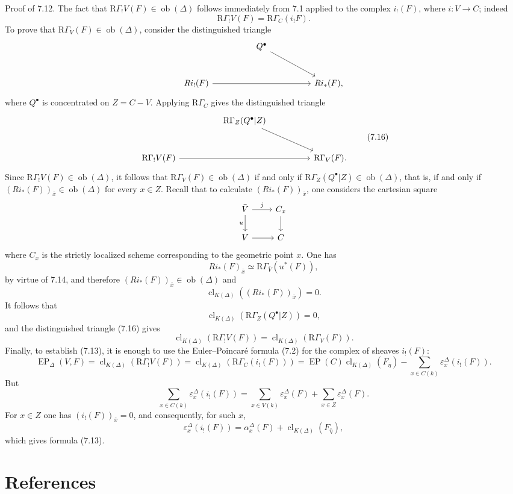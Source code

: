 \documentclass[11pt]{article}
\providecommand{\EP}{\operatorname{EP}}
\providecommand{\Ob}{\operatorname{ob}}
\providecommand{\Ob}{\operatorname{ob}}
\providecommand{\EP}{\operatorname{EP}}
\providecommand{\Ob}{\operatorname{Ob}}
\providecommand{\clK}[1]{\operatorname{cl}_{K(#1)}}
\providecommand{\RG}{\mathrm R\Gamma}
\providecommand{\Ob}{\operatorname{ob}}
\begin{document}
Proof of 7.12. The fact that $\RG_!V(F)\in\Ob(\Delta)$ follows immediately from 7.1 applied to the complex $i_!(F)$, where $i:V\to C$; indeed
\[
\RG_!V(F)=\RG_C(i_!F).
\]
To prove that $\RG_V(F)\in\Ob(\Delta)$, consider the distinguished triangle
\[
\begin{tikzcd}[column sep=huge,row sep=large]
& Q^\bullet \arrow[dr] &\\
Ri_!(F) \arrow[rr] && Ri_*(F),
\end{tikzcd}
\]
where $Q^\bullet$ is concentrated on $Z=C-V$. Applying $\RG_C$ gives the distinguished triangle
\[
\begin{tikzcd}[column sep=huge,row sep=large]
& \RG_Z(Q^\bullet|Z) \arrow[dr] &\\
\RG_!V(F) \arrow[rr] && \RG_V(F).
\end{tikzcd}
\tag{7.16}
\]
Since $\RG_!V(F)\in\Ob(\Delta)$, it follows that $\RG_V(F)\in\Ob(\Delta)$ if and only if $\RG_Z(Q^\bullet|Z)\in\Ob(\Delta)$, that is, if and only if $(Ri_*(F))_{\bar x}\in\Ob(\Delta)$ for every $x\in Z$. Recall that to calculate $(Ri_*(F))_{\bar x}$, one considers the cartesian square
\[
\begin{tikzcd}
\bar V \arrow[r,"j"] \arrow[d,"u"'] & C_x \arrow[d]\\
V \arrow[r] & C
\end{tikzcd}
\]
where $C_x$ is the strictly localized scheme corresponding to the geometric point $x$. One has
\[
Ri_*(F)_{\bar x}\simeq \RG_{\bar V}(u^*(F)),
\]
by virtue of 7.14, and therefore $(Ri_*(F))_{\bar x}\in\Ob(\Delta)$ and
\[
\clK{\Delta}((Ri_*(F))_{\bar x})=0.
\]
It follows that
\[
\clK{\Delta}(\RG_Z(Q^\bullet|Z))=0,
\]
and the distinguished triangle (7.16) gives
\[
\clK{\Delta}(\RG_!V(F))=\clK{\Delta}(\RG_V(F)).
\]
Finally, to establish (7.13), it is enough to use the Euler--Poincaré formula (7.2) for the complex of sheaves $i_!(F)$:
\[
\EP_\Delta(V,F)
=
\clK{\Delta}(\RG_!V(F))
=
\clK{\Delta}(\RG_C(i_!(F)))
=
\EP(C)\clK{\Delta}(F_{\bar\eta})
-\sum_{x\in C(k)}\varepsilon_x^\Delta(i_!(F)).
\]
But
\[
\sum_{x\in C(k)}\varepsilon_x^\Delta(i_!(F))
=
\sum_{x\in V(k)}\varepsilon_x^\Delta(F)
+\sum_{x\in Z}\varepsilon_x^\Delta(F).
\]
For $x\in Z$ one has $(i_!(F))_{\bar x}=0$, and consequently, for such $x$,
\[
\varepsilon_x^\Delta(i_!(F))
=
\alpha_x^\Delta(F)+\clK{\Delta}(F_{\bar\eta}),
\]
which gives formula (7.13).

\section*{References}
\end{document}
